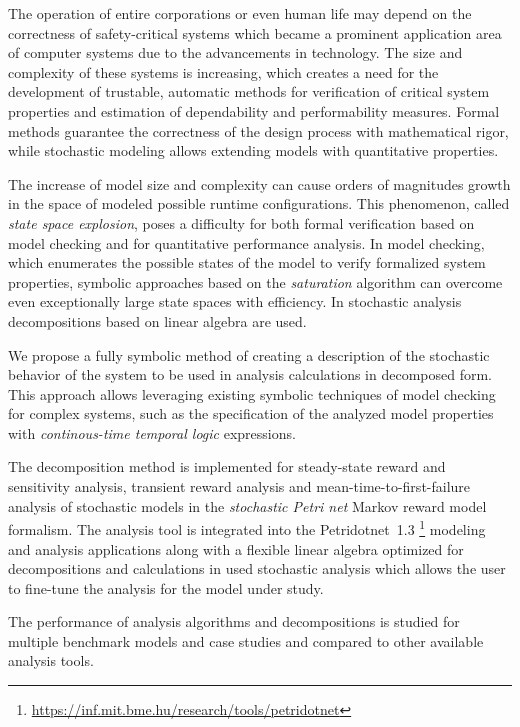 The operation of entire corporations or even human life may depend on
the correctness of safety-critical systems which became a prominent
application area of computer systems due to the advancements in
technology. The size and complexity of these systems is increasing,
which creates a need for the development of trustable, automatic methods
for verification of critical system properties and estimation of
dependability and performability measures. Formal methods guarantee
the correctness of the design process with mathematical rigor, while
stochastic modeling allows extending models with quantitative
properties.

The increase of model size and complexity can cause orders of
magnitudes growth in the space of modeled possible runtime
configurations. This phenomenon, called \emph{state space explosion},
poses a difficulty for both formal verification based on model
checking and for quantitative performance analysis. In model checking,
which enumerates the possible states of the model to verify formalized
system properties, symbolic approaches based on the \emph{saturation}
algorithm can overcome even exceptionally large state spaces with
efficiency. In stochastic analysis decompositions based on linear
algebra are used.

We propose a fully symbolic method of creating a description of the
stochastic behavior of the system to be used in analysis calculations
in decomposed form. This approach allows leveraging existing symbolic
techniques of model checking for complex systems, such as the
specification of the analyzed model properties with
\emph{continous-time temporal logic}  expressions.

The decomposition method is implemented for steady-state reward and
sensitivity analysis, transient reward analysis and
mean-time-to-first-failure analysis of stochastic models in the
\emph{stochastic Petri net}  Markov reward model
formalism. The analysis tool is integrated into the Petridotnet~1.3%
\footnote{\url{https://inf.mit.bme.hu/research/tools/petridotnet}}
modeling and analysis applications along with a flexible linear
algebra optimized for decompositions and calculations in used
stochastic analysis which allows the user to fine-tune the analysis
for the model under study.

The performance of analysis algorithms and decompositions is studied
for multiple benchmark models and case studies and compared to other
available analysis tools.
